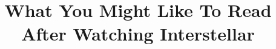 \documentclass{vldb}
\begin{document}

\newtheorem{definition}{\scriptsize {\small D}EFINITION}
\newtheorem{theorem}{\scriptsize {\small T}HEOREM}
\newtheorem{lemma}{\scriptsize {\small T}HEOREM}
\newcommand{\crossrec}{\textsc{X-Map}\xspace}
\newcommand{\crossrecib}{\textsc{X-Map-ib}\xspace}
\newcommand{\crossrecub}{\textsc{X-Map-ub}\xspace}
\newcommand{\privcrossrec}{\textsc{PX-Map}\xspace}
\newcommand{\npcrossrec}{\textsc{NX-Map}\xspace}
\newcommand{\npcrossrecib}{\textsc{NX-Map-ib}\xspace}
\newcommand{\npcrossrecub}{\textsc{NX-Map-ub}\xspace}
\newcommand{\mixcrossrec}{\texttt{(\hspace{-0.5mm}P\hspace{-0.5mm})\hspace{-1mm}X-Map}\xspace}
\newcommand{\graphsim}{\textsc{X-Sim}\xspace}
\newcommand{\framework}{\textsc{X-Ware}\xspace}
\renewcommand{\algorithmicrequire}{\textbf{Input:}}
\renewcommand{\algorithmicensure}{\textbf{Output:}}
\newcommand\Algphase[1]{%
\vspace*{-.7\baselineskip}\Statex\hspace*{\dimexpr-\algorithmicindent-2pt\relax}\rule{0.48\textwidth}{0.4pt}%
\Statex\hspace*{-\algorithmicindent}\textbf{#1}%
\vspace*{-.7\baselineskip}\Statex\hspace*{\dimexpr-\algorithmicindent-2pt\relax}\rule{0.48\textwidth}{0.4pt}%
}

\setlength{\abovedisplayskip}{-0.8pt}
\setlength{\belowdisplayskip}{-0.8pt}
\setlength{\textfloatsep}{0pt}



\title{What You Might Like To Read After Watching Interstellar}



%
%
%
%
\end{document}
